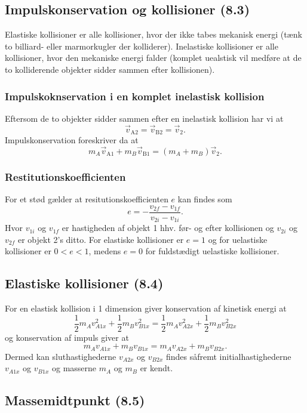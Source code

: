 \subsection{Impulskonservation og kollisioner (8.3)}
Elastiske kollisioner er alle kollisioner, hvor der ikke tabes mekanisk energi (tænk to billiard- eller marmorkugler der kolliderer). Inelastiske kollisioner er alle kollisioner, hvor den mekaniske energi falder (komplet uealstisk vil medføre at de to kolliderende objekter sidder sammen efter kollisionen).

\subsubsection{Impulskoknservation i en komplet inelastisk kollision} \label{afs:ekonsin}
Eftersom de to objekter sidder sammen efter en inelastisk kollision har vi at
\[ 
  \Vec{v}_{\text{A2}} = \Vec{v}_{\text{B2}} = \Vec{v}_{2}
.\]
Impulskonservation foreskriver da at
\[ 
m_A \Vec{v}_{\text{A1}} + m_B \Vec{v}_{\text{B1}} = (m_A + m_B) \Vec{v}_2
.\]

\subsubsection{Restitutionskoefficienten}
For et stød gælder at resitutionskoefficienten $e$ kan findes som
\[ 
e = - \frac{v_{2f} - v_{1f}}{v_{2i} - v_{1i}}
.\]
Hvor $v_{1i}$ og $v_{1f}$ er hastigheden af objekt 1 hhv. før- og efter kollisionen og $v_{2i}$ og $v_{2f}$ er objekt 2's ditto. For elastiske kollisioner er $e = 1$ og for uelastiske kollisioner er $0< e < 1$, medens $e = 0$ for fuldstædigt uelastiske kollisioner.


\subsection{Elastiske kollisioner (8.4)}  \label{afs:elakol}
For en elastisk kollision i 1 dimension giver konservation af kinetisk energi at
\[ 
\frac{1}{2}m_A v_{A1x}^2 + \frac{1}{2}m_B v_{B1x}^2 = \frac{1}{2}m_A v_{A2x}^2 + \frac{1}{2}m_B v_{B2x}^2
\]
og konservation af impuls giver at
\[ 
m_A v_{A1x} + m_B v_{B1x} = m_A v_{A2x} + m_B v_{B2x}
.\]
Dermed kan sluthastighederne $v_{A2x}$ og $v_{B2x}$ findes såfremt initialhastighederne $v_{A1x}$ og $v_{B1x}$ og masserne $m_A$ og $m_B$ er kendt.


\subsection{Massemidtpunkt (8.5)}

